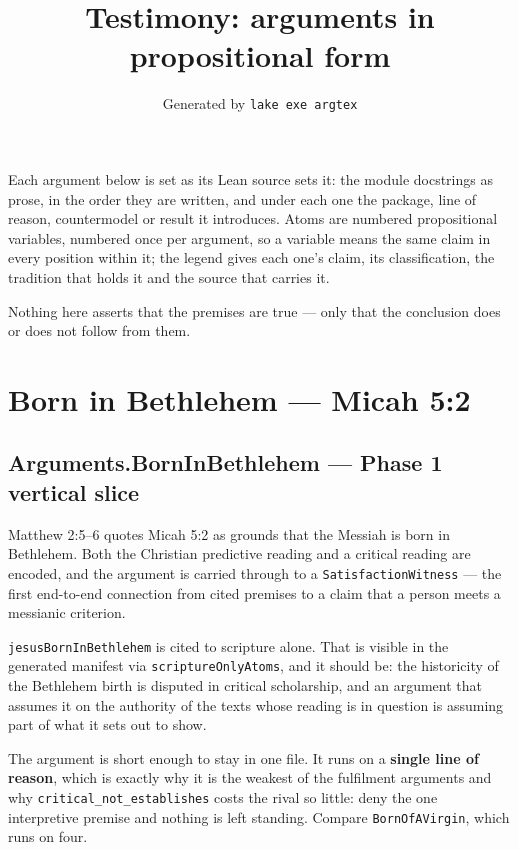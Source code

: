 \documentclass[11pt]{article}
\title{Testimony: arguments in propositional form}
\date{Generated by \texttt{lake exe argtex}}
\begin{document}
\maketitle
\noindent Each argument below is set as its Lean source sets it: the module docstrings as prose, in the order they are written, and under each one the package, line of reason, countermodel or result it introduces. Atoms are numbered propositional variables, numbered once per argument, so a variable means the same claim in every position within it; the legend gives each one's claim, its classification, the tradition that holds it and the source that carries it.

\noindent Nothing here asserts that the premises are true --- only that the conclusion does or does not follow from them.

\tableofcontents
\clearpage
\section*{Born in Bethlehem — Micah 5:2}

\subsection*{Arguments.BornInBethlehem — Phase 1 vertical slice}
Matthew 2:5–6 quotes Micah 5:2 as grounds that the Messiah is born in Bethlehem. Both the Christian predictive reading and a critical reading are encoded, and the argument is carried through to a \texttt{Satisfaction\allowbreak{}Witness} — the first end-to-end connection from cited premises to a claim that a person meets a messianic criterion.

\texttt{jesus\allowbreak{}Born\allowbreak{}In\allowbreak{}Bethlehem} is cited to scripture alone. That is visible in the generated manifest via \texttt{scripture\allowbreak{}Only\allowbreak{}Atoms}, and it should be: the historicity of the Bethlehem birth is disputed in critical scholarship, and an argument that assumes it on the authority of the texts whose reading is in question is assuming part of what it sets out to show.

The argument is short enough to stay in one file. It runs on a \textbf{single line of reason}, which is exactly why it is the weakest of the fulfilment arguments and why \texttt{critical\_\allowbreak{}not\_\allowbreak{}establishes} costs the rival so little: deny the one interpretive premise and nothing is left standing. Compare \texttt{Born\allowbreak{}Of\allowbreak{}AVirgin}, which runs on four.
\end{document}
